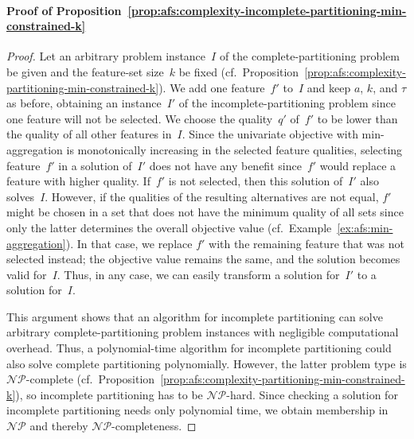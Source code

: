 \documentclass{article}
\theoremstyle{definition}
\begin{document}
\paragraph{Proof of Proposition~\ref{prop:afs:complexity-incomplete-partitioning-min-constrained-k}}
%
\begin{proof}
Let an arbitrary problem instance~$I$ of the complete-partitioning problem be given and the feature-set size~$k$ be fixed (cf.~Proposition~\ref{prop:afs:complexity-partitioning-min-constrained-k}).
We add one feature~$f'$ to~$I$ and keep $a$, $k$, and $\tau$ as before, obtaining an instance~$I'$ of the incomplete-partitioning problem since one feature will not be selected.
We choose the quality~$q'$ of~$f'$ to be lower than the quality of all other features in~$I$.
Since the univariate objective with min-aggregation is monotonically increasing in the selected feature qualities, selecting feature~$f'$ in a solution of~$I'$ does not have any benefit since~$f'$ would replace a feature with higher quality.
If~$f'$ is not selected, then this solution of~$I'$ also solves~$I$.
However, if the qualities of the resulting alternatives are not equal, $f'$ might be chosen in a set that does not have the minimum quality of all sets since only the latter determines the overall objective value (cf.~Example~\ref{ex:afs:min-aggregation}).
In that case, we replace $f'$ with the remaining feature that was not selected instead; the objective value remains the same, and the solution becomes valid for~$I$.
Thus, in any case, we can easily transform a solution for~$I'$ to a solution for~$I$.
	
This argument shows that an algorithm for incomplete partitioning can solve arbitrary complete-partitioning problem instances with negligible computational overhead.
Thus, a polynomial-time algorithm for incomplete partitioning could also solve complete partitioning polynomially.
However, the latter problem type is $\mathcal{NP}$-complete (cf.~Proposition~\ref{prop:afs:complexity-partitioning-min-constrained-k}), so incomplete partitioning has to be $\mathcal{NP}$-hard.
Since checking a solution for incomplete partitioning needs only polynomial time, we obtain membership in $\mathcal{NP}$ and thereby $\mathcal{NP}$-completeness.
\end{proof}
\end{document}

